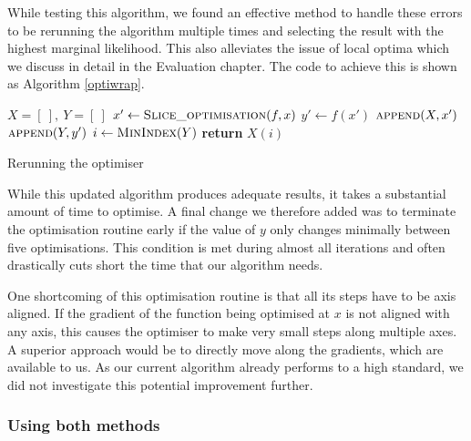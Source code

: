 \documentclass[a4paper,12pt,twoside,openright]{report}
\begin{document}
While testing this algorithm, we found an effective method to handle these errors to be rerunning the algorithm multiple times and selecting the result with the highest marginal likelihood. This also alleviates the issue of local optima which we discuss in detail in the Evaluation chapter. The code to achieve this is shown as Algorithm \ref{optiwrap}.

\begin{algorithm}
\begin{algorithmic}[1]
\State $X = [\ ],\ Y = [\ ]$
\State $x'\gets \Call{Slice\_optimisation}{f, x}$
\State $y'\gets f(x')$
\State $\Call{append}{X, x'}$
\State $\Call{append}{Y, y'}$
\EndFor
\State $i\gets \Call{MinIndex}{Y}$
\State \textbf{return} $X(i)$
\EndProcedure
\end{algorithmic}
\caption{Rerunning the optimiser}
\label{optiwrap}
\end{algorithm}

While this updated algorithm produces adequate results, it takes a substantial amount of time to optimise. A final change we therefore added was to terminate the optimisation routine early if the value of $y$ only changes minimally between five optimisations. This condition is met during almost all iterations and often drastically cuts short the time that our algorithm needs.

One shortcoming of this optimisation routine is that all its steps have to be axis aligned. If the gradient of the function being optimised at $x$ is not aligned with any axis, this causes the optimiser to make very small steps along multiple axes. A superior approach would be to directly move along the gradients, which are available to us. As our current algorithm already performs to a high standard, we did not investigate this potential improvement further.





\subsubsection{Using both methods} %
\end{document}
